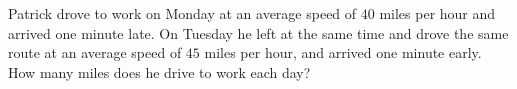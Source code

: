 Patrick drove to work on Monday at an average speed of $40$ miles per hour and arrived one minute late. On Tuesday he left at the same time and drove the same route at an average speed of $45$ miles per hour, and arrived one minute early. How many miles does he drive to work each day?
